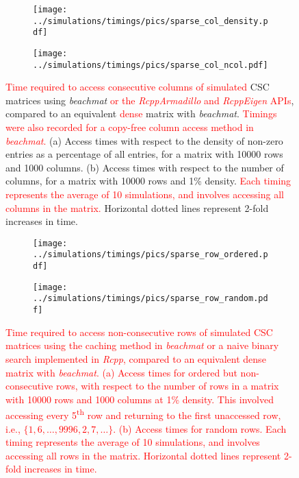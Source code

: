 \documentclass{article}
\newcommand{\beachmat}{\textit{beachmat}}
\newcommand{\revised}[1]{\textcolor{red}{#1}}
\begin{document}
\begin{figure}[bt]
    \centering
    \begin{subfigure}[b]{0.49\textwidth}
        \texttt{[image: ../simulations/timings/pics/sparse\_col\_density.pdf]}
        \caption{}
    \end{subfigure}
    \begin{subfigure}[b]{0.49\textwidth}
        \texttt{[image: ../simulations/timings/pics/sparse\_col\_ncol.pdf]}
        \caption{}
    \end{subfigure}
    \caption{\revised{Time required to access consecutive columns of simulated} CSC matrices using \beachmat{} \revised{or the \textit{RcppArmadillo} and \textit{RcppEigen} APIs}, compared to an equivalent \revised{dense} matrix with \beachmat{}.
        \revised{Timings were also recorded for a copy-free column access method in \beachmat{}.}
        (a) Access times with respect to the density of non-zero entries as a percentage of all entries, for a matrix with 10000 rows and 1000 columns.
        (b) Access times with respect to the number of columns, for a matrix with 10000 rows and 1\% density.
        \revised{Each timing represents the average of 10 simulations, and involves accessing all columns in the matrix.}
        Horizontal dotted lines represent 2-fold increases in time.
    }
    \label{fig:sparsecol}
\end{figure}

\begin{figure}[bt]
    \centering
    \begin{subfigure}[b]{0.49\textwidth}
        \texttt{[image: ../simulations/timings/pics/sparse\_row\_ordered.pdf]}
        \caption{}
    \end{subfigure}
    \begin{subfigure}[b]{0.49\textwidth}
        \texttt{[image: ../simulations/timings/pics/sparse\_row\_random.pdf]}
        \caption{}
    \end{subfigure}
    \caption{\revised{Time required to access non-consecutive rows of simulated CSC matrices using the caching method in \beachmat{} or a naive binary search implemented in \textit{Rcpp}, compared to an equivalent \revised{dense} matrix with \beachmat{}.
        (a) Access times for ordered but non-consecutive rows, with respect to the number of rows in a matrix with 10000 rows and 1000 columns at 1\% density.
        This involved accessing every 5\textsuperscript{th} row and returning to the first unaccessed row, i.e., $\{1, 6, \ldots, 9996, 2, 7, \ldots\}$.
        (b) Access times for random rows.
        Each timing represents the average of 10 simulations, and involves accessing all rows in the matrix.
Horizontal dotted lines represent 2-fold increases in time.}}
    \label{fig:sparserowrandom}
\end{figure}
\end{document}
